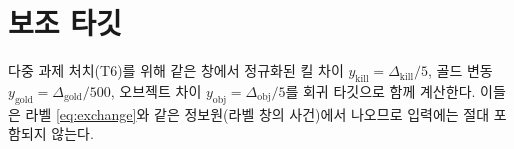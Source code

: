 
\section{보조 타깃}
\label{sec:label-aux}

다중 과제 처치(T6)를 위해 같은 창에서 정규화된 킬 차이 $y_{\mathrm{kill}} = \Delta_{\mathrm{kill}}/5$, 골드 변동 $y_{\mathrm{gold}} = \Delta_{\mathrm{gold}}/500$, 오브젝트 차이 $y_{\mathrm{obj}} = \Delta_{\mathrm{obj}}/5$를 회귀 타깃으로 함께 계산한다. 이들은 라벨 \eqref{eq:exchange}와 같은 정보원(라벨 창의 사건)에서 나오므로 입력에는 절대 포함되지 않는다.
